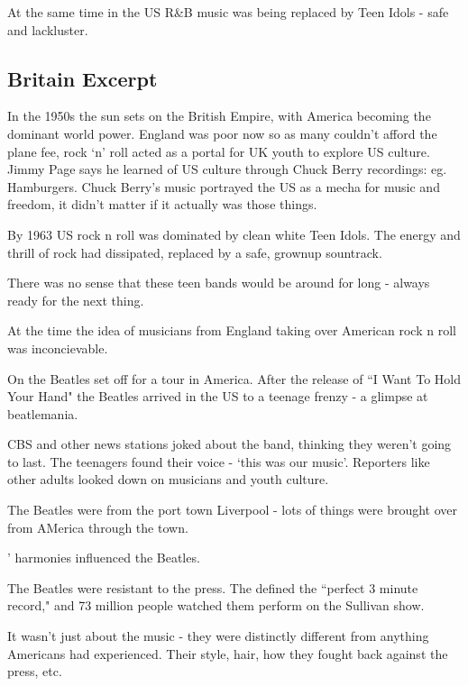\documentclass[12pt, a4paper, twoside, openright, titlepage]{book}
\begin{document}
At the same time in the US R\&B music was being replaced by Teen Idols - safe and lackluster.

\subsection{Britain Excerpt}

In the 1950s the sun sets on the British Empire, with America becoming the dominant world power. England was poor now so as many couldn't afford the plane fee, rock `n' roll acted as a portal for UK youth to explore US culture. Jimmy Page says he learned of US culture through Chuck Berry recordings: eg. Hamburgers. Chuck Berry's music portrayed the US as a mecha for music and freedom, it didn't matter if it actually was those things.


By 1963 US rock n roll was dominated by clean white Teen Idols. The energy and thrill of rock had dissipated, replaced by a safe, grownup sountrack.

There was no sense that these teen bands would be around for long - always ready for the next thing. 


\begin{note}{}{}
    At the time the idea of musicians from England taking over American rock n roll was inconcievable.
\end{note}

On  the Beatles set off for a tour in America. After the release of ``I Want To Hold Your Hand" the Beatles arrived in the US to a teenage frenzy - a glimpse at beatlemania.


CBS and other news stations joked about the band, thinking they weren't going to last. The teenagers found their voice - `this was our music'. Reporters like other adults looked down on musicians and youth culture.

\begin{note}{}{}
    The Beatles were from the port town Liverpool - lots of things were brought over from AMerica through the town.
\end{note}

\begin{rmk}{}{}
    ' harmonies influenced the Beatles.
\end{rmk}


The Beatles were resistant to the press. The defined the ``perfect 3 minute record," and 73 million people watched them perform on the Sullivan show.

\begin{note}{}{}
    It wasn't just about the music - they were distinctly different from anything Americans had experienced. Their style, hair, how they fought back against the press, etc.
\end{note}
\end{document}
